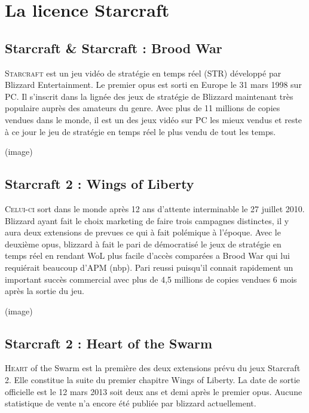 \section{La licence Starcraft}%
\label{sec:la_licence_starcraft}

\subsection{Starcraft \& Starcraft : Brood War}%
\label{sub:starcraft_&_starcraft_brood_war}

\lettrine{S}{tarcraft} est un jeu vidéo de stratégie en temps réel (STR) développé
par Blizzard Entertainment. Le premier opus est sorti en Europe le 31
mars 1998 sur PC. Il s'inscrit dans la lignée des jeux de stratégie de
Blizzard maintenant très populaire auprès des amateurs du genre. Avec
plus de 11 millions de copies vendues dans le monde, il est un des
jeux vidéo sur PC les mieux vendus et reste à ce jour le jeu de
stratégie en temps réel le plus vendu de tout les temps.

(image)

\subsection{Starcraft 2 : Wings of Liberty}%
\label{sub:starcraft_2_wings_of_liberty}

\lettrine{C}{elui-ci} sort dans le monde après 12 ans d'attente
interminable le 27 juillet 2010. Blizzard ayant fait le choix marketing
de faire trois campagnes distinctes, il y aura deux extensions de
prevues ce qui à fait polémique à l'époque. Avec le deuxième opus,
blizzard à fait le pari de démocratisé le jeux de stratégie en temps
réel en rendant WoL plus facile d'accès comparées a Brood War qui lui
requiérait beaucoup d'APM (nbp). Pari reussi puisqu'il connait
rapidement un important succès commercial avec plus de 4,5 millions de
copies vendues 6 mois après la sortie du jeu.

(image)

\subsection{Starcraft 2 : Heart of the Swarm}%
\label{sub:starcraft_2_heart_of_the_swarm}

\lettrine{H}{eart} of the Swarm est la première des deux extensions
prévu du jeux Starcraft 2. Elle constitue la suite du premier chapitre
Wings of Liberty. La date de sortie officielle est le 12 mars 2013 soit
deux ans et demi après le premier opus.  Aucune statistique de vente n'a
encore été publiée par blizzard actuellement.

